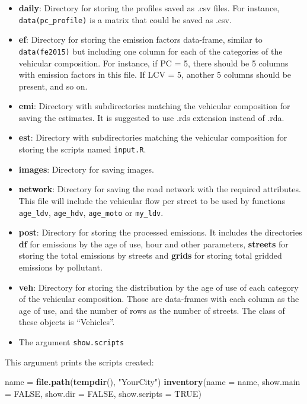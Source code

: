 \documentclass[12pt,graybox,envcountchap,sectrefs]{krantz}
\makeatletter
\newenvironment{Shaded}{\begin{snugshade}}{\end{snugshade}}
\newcommand{\KeywordTok}[1]{\textcolor[rgb]{0.13,0.29,0.53}{\textbf{#1}}}
\newcommand{\DataTypeTok}[1]{\textcolor[rgb]{0.13,0.29,0.53}{#1}}
\newcommand{\StringTok}[1]{\textcolor[rgb]{0.31,0.60,0.02}{#1}}
\newcommand{\OtherTok}[1]{\textcolor[rgb]{0.56,0.35,0.01}{#1}}
\newcommand{\NormalTok}[1]{#1}
\newenvironment{kframe}{%
\medskip{}
\setlength{\fboxsep}{.8em}
 \def\at@end@of@kframe{}%
 \ifinner\ifhmode%
  \def\at@end@of@kframe{\end{minipage}}%
  \begin{minipage}{\columnwidth}%
 \fi\fi%
 \def\FrameCommand##1{\hskip\@totalleftmargin \hskip-\fboxsep
 \colorbox{shadecolor}{##1}\hskip-\fboxsep
     \hskip-\linewidth \hskip-\@totalleftmargin \hskip\columnwidth}%
 \MakeFramed {\advance\hsize-\width
   \@totalleftmargin\z@ \linewidth\hsize
   \@setminipage}}%
 {\par\unskip\endMakeFramed%
 \at@end@of@kframe}
\renewenvironment{Shaded}{\begin{kframe}}{\end{kframe}}
\theoremstyle{definition}
\theoremstyle{definition}
\theoremstyle{definition}
\theoremstyle{remark}
\makeatother
\begin{document}
\begin{itemize}
\item
  \textbf{daily}: Directory for storing the profiles saved as .csv
  files. For instance, \texttt{data(pc\_profile)} is a matrix that could
  be saved as .csv.
\item
  \textbf{ef}: Directory for storing the emission factors data-frame,
  similar to \texttt{data(fe2015)} but including one column for each of
  the categories of the vehicular composition. For instance, if PC = 5,
  there should be 5 columns with emission factors in this file. If LCV =
  5, another 5 columns should be present, and so on.
\item
  \textbf{emi}: Directory with subdirectories matching the vehicular
  composition for saving the estimates. It is suggested to use .rds
  extension instead of .rda.
\item
  \textbf{est}: Directory with subdirectories matching the vehicular
  composition for storing the scripts named \texttt{input.R}.
\item
  \textbf{images}: Directory for saving images.
\item
  \textbf{network}: Directory for saving the road network with the
  required attributes. This file will include the vehicular flow per
  street to be used by functions \texttt{age\_ldv}, \texttt{age\_hdv},
  \texttt{age\_moto} or \texttt{my\_ldv}.
\item
  \textbf{post}: Directory for storing the processed emissions. It
  includes the directories \textbf{df} for emissions by the age of use,
  hour and other parameters, \textbf{streets} for storing the total
  emissions by streets and \textbf{grids} for storing total gridded
  emissions by pollutant.
\item
  \textbf{veh}: Directory for storing the distribution by the age of use
  of each category of the vehicular composition. Those are data-frames
  with each column as the age of use, and the number of rows as the
  number of streets. The class of these objects is ``Vehicles''.
\item
  The argument \texttt{show.scripts}
\end{itemize}

This argument prints the scripts created:

\begin{Shaded}
\begin{Highlighting}[]
\NormalTok{name =}\StringTok{ }\KeywordTok{file.path}\NormalTok{(}\KeywordTok{tempdir}\NormalTok{(), }\StringTok{"YourCity"}\NormalTok{)}
\KeywordTok{inventory}\NormalTok{(}\DataTypeTok{name =}\NormalTok{ name, }\DataTypeTok{show.main =} \OtherTok{FALSE}\NormalTok{, }\DataTypeTok{show.dir =} \OtherTok{FALSE}\NormalTok{, }\DataTypeTok{show.scripts =} \OtherTok{TRUE}\NormalTok{)}
\end{Highlighting}
\end{Shaded}
\end{document}
